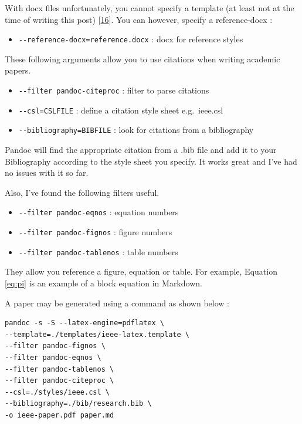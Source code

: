\documentclass[journal,10pt,final]{IEEEtran}
\providecommand{\tightlist}{%
  \setlength{\itemsep}{0pt}\setlength{\parskip}{0pt}}
\begin{document}
With docx files unfortunately, you cannot specify a template (at least
not at the time of writing this post)
{[}\protect\hyperlink{ref-ux5fgooglegroups}{16}{]}. You can however,
specify a reference-docx :

\begin{itemize}
\tightlist
\item
  \texttt{-\/-reference-docx=reference.docx} : docx for reference styles
\end{itemize}

These following arguments allow you to use citations when writing
academic papers.

\begin{itemize}
\tightlist
\item
  \texttt{-\/-filter\ pandoc-citeproc} : filter to parse citations
\item
  \texttt{-\/-csl=CSLFILE} : define a citation style sheet e.g.~ieee.csl
\item
  \texttt{-\/-bibliography=BIBFILE} : look for citations from a
  bibliography
\end{itemize}

Pandoc will find the appropriate citation from a .bib file and add it to
your Bibliography according to the style sheet you specify. It works
great and I've had no issues with it so far.

Also, I've found the following filters useful.

\begin{itemize}
\tightlist
\item
  \texttt{-\/-filter\ pandoc-eqnos} : equation numbers
\item
  \texttt{-\/-filter\ pandoc-fignos} : figure numbers
\item
  \texttt{-\/-filter\ pandoc-tablenos} : table numbers
\end{itemize}

They allow you reference a figure, equation or table. For example,
Equation \ref{eq:pi} is an example of a block equation in Markdown.

A paper may be generated using a command as shown below :

\begin{verbatim}
pandoc -s -S --latex-engine=pdflatex \
--template=./templates/ieee-latex.template \
--filter pandoc-fignos \ 
--filter pandoc-eqnos \
--filter pandoc-tablenos \
--filter pandoc-citeproc \
--csl=./styles/ieee.csl \
--bibliography=./bib/research.bib \
-o ieee-paper.pdf paper.md
\end{verbatim}
\end{document}
